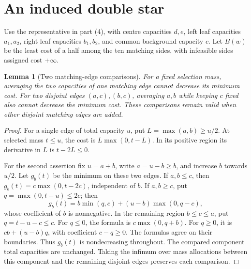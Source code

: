 \documentclass[11pt]{article}
\newtheorem{lemma}[theorem]{Lemma}
\begin{document}
\section{An induced double star}
Use the representative in part (4), with centre capacities $d,e$,
left leaf capacities $a_1,a_2$, right leaf capacities $b_1,b_2$,
and common background capacity $c$.
Let $B(w)$ be the least cost of a half among the ten matching sides,
with infeasible sides assigned cost $+\infty$.

\begin{lemma}[Two matching-edge comparisons]\label{lem:smoothing}
For a fixed selection mass, averaging the two capacities of one matching
edge cannot decrease its minimum cost. For two disjoint edges
$(a,c),(b,c)$, averaging $a,b$ while keeping $c$ fixed also cannot
decrease the minimum cost.
These comparisons remain valid when other disjoint matching edges
are added.
\end{lemma}
\begin{proof}
For a single edge of total capacity $u$, put $L=\max(a,b)\geq u/2$.
At selected mass $t\leq u$, the cost is $L\max(0,t-L)$.
In its positive region its derivative in $L$ is $t-2L\leq0$.

For the second assertion fix $u=a+b$, write $a=u-b\geq b$, and increase
$b$ towards $u/2$. Let $g_b(t)$ be the minimum on these two edges.
If $a,b\leq c$, then $g_b(t)=c\max(0,t-2c)$, independent of $b$.
If $a,b\geq c$, put $q=\max(0,t-u)\leq2c$; then
\[
 g_b(t)=b\min(q,c)+(u-b)\max(0,q-c),
\]
whose coefficient of $b$ is nonnegative.
In the remaining region $b\leq c\leq a$, put $q=t-u-c\leq c$.
For $q\leq0$, the formula is $c\max(0,q+b)$.
For $q\geq0$, it is $cb+(u-b)q$, with coefficient $c-q\geq0$.
The formulas agree on their boundaries.
Thus $g_b(t)$ is nondecreasing throughout.
The compared component total capacities are unchanged. Taking the
infimum over mass allocations between this component and the remaining
disjoint edges preserves each comparison.
\end{proof}
\end{document}
